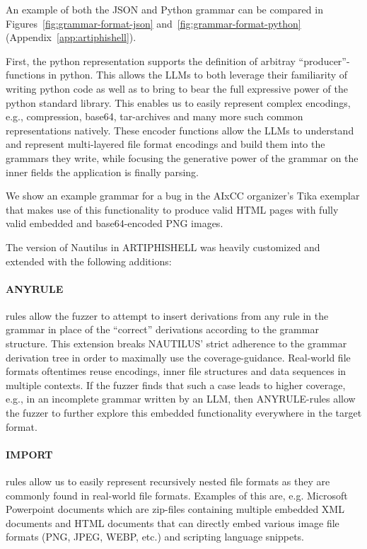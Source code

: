 An example of both the JSON and Python grammar can be compared in Figures~\ref{fig:grammar-format-json} and~\ref{fig:grammar-format-python} (Appendix~\ref{app:artiphishell}).

First, the python representation supports the definition of arbitray ``producer''-functions in python. This allows the LLMs to both leverage their familiarity of writing python code as well as to bring to bear the full expressive power of the python standard library.
This enables us to easily represent complex encodings, e.g., compression, base64, tar-archives and many more such common representations natively.
These encoder functions allow the LLMs to understand and represent multi-layered file format encodings and build them into the grammars they write, while focusing the generative power of the grammar on the inner fields the application is finally parsing.

We show an example grammar for a bug in the AIxCC organizer's Tika exemplar that makes use of this functionality to produce valid HTML pages with fully valid embedded and base64-encoded PNG images.

The version of Nautilus in ARTIPHISHELL was heavily customized and extended with the following additions:

\paragraph{ANYRULE} rules allow the fuzzer to attempt to insert derivations from any rule in the grammar in place of the ``correct'' derivations according to the grammar structure.
This extension breaks NAUTILUS' strict adherence to the grammar derivation tree in order to maximally use the coverage-guidance.
Real-world file formats oftentimes reuse encodings, inner file structures and data sequences in multiple contexts.
If the fuzzer finds that such a case leads to higher coverage, e.g., in an incomplete grammar written by an LLM, then ANYRULE-rules allow the fuzzer to further explore this embedded functionality everywhere in the target format.

\paragraph{IMPORT} rules allow us to easily represent recursively nested file formats as they are commonly found in real-world file formats.
Examples of this are, e.g. Microsoft Powerpoint documents which are zip-files containing multiple embedded XML documents and HTML documents that can directly embed various image file formats (PNG, JPEG, WEBP, etc.) and scripting language snippets.

